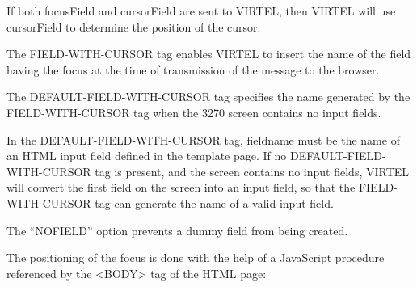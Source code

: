 \documentclass[letterpaper,10pt,english]{sphinxmanual}
\begin{document}
If both focusField and cursorField are sent to VIRTEL, then VIRTEL will use cursorField to determine the position of the cursor.


The FIELD-WITH-CURSOR tag enables VIRTEL to insert the name of the field having the focus at the time of transmission of the message to the browser.

\begin{sphinxVerbatim}[commandchars=\\\{\}]
  
\end{sphinxVerbatim}


The DEFAULT-FIELD-WITH-CURSOR tag specifies the name generated by the FIELD-WITH-CURSOR tag when the 3270 screen contains no input fields.

\begin{sphinxVerbatim}[commandchars=\\\{\}]
     
\end{sphinxVerbatim}

In the DEFAULT-FIELD-WITH-CURSOR tag, fieldname must be the name of an HTML input field defined in the template
page. If no DEFAULT-FIELD-WITH-CURSOR tag is present, and the screen contains no input fields, VIRTEL will convert
the first field on the screen into an input field, so that the FIELD-WITH-CURSOR tag can generate the name of a valid
input field.

The “NOFIELD” option prevents a dummy field from being created.


The positioning of the focus is done with the help of a JavaScript procedure referenced by the \textless{}BODY\textgreater{} tag of the HTML page:
\end{document}

